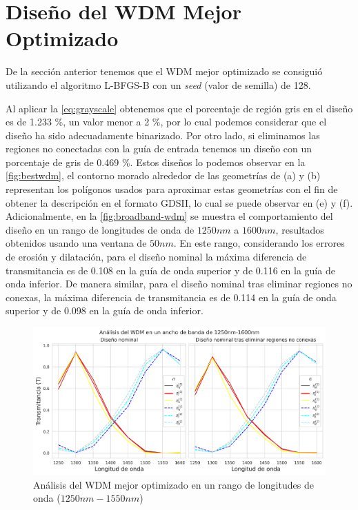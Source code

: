 \section{Diseño del WDM Mejor Optimizado}\label{sec:best-wdm}

De la sección anterior tenemos que el WDM mejor optimizado se consiguió
utilizando el algoritmo L-BFGS-B con un \emph{seed} (valor de semilla) de 128.

Al aplicar la \autoref{eq:grayscale} obtenemos que el porcentaje de región gris en el diseño
es de 1.233 \%, un valor menor a 2 \%, por lo cual podemos considerar que el diseño ha sido
adecuadamente binarizado. 
Por otro lado, si eliminamos las regiones no conectadas con la guía de entrada
tenemos un diseño con un porcentaje de gris de 0.469 \%.
Estos diseños lo podemos observar en la \autoref{fig:bestwdm},
el contorno morado alrededor de las geometrías de (a) y (b) representan los polígonos
usados para aproximar estas geometrías con el fin de obtener la descripción en el formato
GDSII, lo cual se puede observar en (e) y (f).
Adicionalmente, en la \autoref{fig:broadband-wdm} se muestra el comportamiento del diseño
en un rango de longitudes de onda de $1250nm$ a $1600 nm$, resultados obtenidos usando una ventana de $50nm$.
En este rango, considerando los errores de erosión y dilatación, 
para el diseño nominal la máxima diferencia de transmitancia 
es de 0.108 en la guía de onda superior y de 0.116 en la guía de onda inferior.
De manera similar, para el diseño nominal tras eliminar regiones no conexas,
la máxima diferencia de transmitancia
es de 0.114 en la guía de onda superior y de 0.098 en la guía de onda inferior.

\begin{figure}[ht]
  \centering
  \includegraphics[width=\textwidth]{image/results/wdm/best/broadband-wdm.png}
  \caption{Análisis del WDM mejor optimizado en un rango de longitudes de onda ($1250 nm-1550 nm$)}
  \label{fig:broadband-wdm}
\end{figure}



